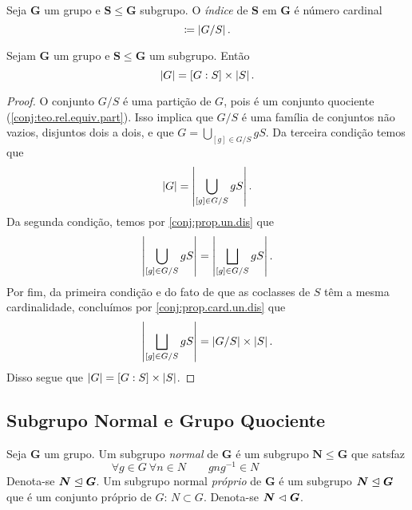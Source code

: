 \begin{defi}
Seja $\bm G$ um grupo e $\bm S \leq \bm G$ subgrupo. O \emph{índice} de $\bm S$ em $\bm G$ é número cardinal
	\begin{equation*}
	[G : S] \coloneqq \card{G/S}.
	\end{equation*}
\end{defi}

\begin{prop}
Sejam $\bm G$ um grupo e $\bm S \leq \bm G$ um subgrupo. Então
	\begin{equation*}
	\left\vert{G}\right\vert=[G:S] \times \left\vert{S}\right\vert.
	\end{equation*}
\end{prop}
\begin{proof}
O conjunto $G/S$ é uma partição de $G$, pois é um conjunto quociente (\ref{conj:teo.rel.equiv.part}). Isso implica que $G/S$ é uma família de conjuntos não vazios, disjuntos dois a dois, e que $G = \bigcup_{[g] \in G/S} gS$. Da terceira condição temos que
	\begin{equation*}
	\left\vert{G}\right\vert = \left\vert{\bigcup_{[g] \in G/S} gS}\right\vert.
	\end{equation*}
Da segunda condição, temos por \ref{conj:prop.un.dis} que
	\begin{equation*}
	\left\vert{\bigcup_{[g] \in G/S} gS}\right\vert = \left\vert{\bigsqcup_{[g] \in G/S} gS}\right\vert.
	\end{equation*}
Por fim, da primeira condição e do fato de que as coclasses de $S$ têm a mesma cardinalidade, concluímos por \ref{conj:prop.card.un.dis} que
	\begin{equation*}
	\left\vert{\bigsqcup_{[g] \in G/S} gS}\right\vert = \left\vert{G/S}\right\vert \times \left\vert{S}\right\vert.
	\end{equation*}
Disso segue que $\left\vert{G}\right\vert=[G:S] \times \left\vert{S}\right\vert$.
\end{proof}

\subsection{Subgrupo Normal e Grupo Quociente}

\begin{defi}
Seja $\bm G$ um grupo. Um subgrupo \emph{normal} de $\bm G$ é um subgrupo $\bm N \leq \bm G$ que satsfaz
	\begin{equation*}
	\tag{Normalidade} \forall g \in G\ \forall n  \in N \qquad gng^{-1} \in N \qquad\qquad \label{SGN}
	\end{equation*}
\noindent
Denota-se $\bm N \mathrel{\unlhd} \bm G$. Um subgrupo normal \emph{próprio} de $\bm G$ é um subgrupo $\bm N \mathrel{\unlhd} \bm G$ que é um conjunto próprio de $G$: $N \subset G$. Denota-se $\bm N \mathrel{\lhd} \bm G$.
\end{defi}

